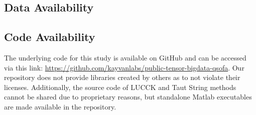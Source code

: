 \subsection*{Data Availability}


\subsection*{Code Availability}
The underlying code for this study is available on GitHub and can be accessed via this link: \url{https://github.com/kayvanlabs/public-tensor-bigdata-qsofa}. Our repository does not provide libraries created by others as to not violate their licenses. Additionally, the source code of LUCCK and Taut String methods cannot be shared due to proprietary reasons, but standalone Matlab executables are made available in the repository.